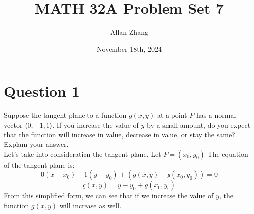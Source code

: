\documentclass[hidelinks]{article}
\title{\textbf{MATH 32A Problem Set 7}}
\author{Allan Zhang}
\date{November 18th, 2024}
\begin{document}
\hypersetup{bookmarksnumbered=true,}
\pagecolor{white}
\color{black}
\maketitle


\section{Question 1}
Suppose the tangent plane to a function $g(x, y)$ at a point $P$ has a normal
vector $\langle 0, -1, 1 \rangle$. If you increase the value of $ y$ by a small amount, do you expect that the
function will increase in value, decrease in value, or stay the same? Explain your answer. \\
Let's take into consideration the tangent plane. Let $P = (x_0, y_0)$ The equation of the tangent plane is: \[
0(x-x_0) -1(y-y_0)+(g(x, y) -g(x_0, y_0)) = 0
\]
\[
g(x, y) = y - y_0 + g(x_0, y_0)
\]
From this simplified form, we can see that if we increase the value of $y$, the function $g(x, y)$ will increase as well. 

\newpage
\end{document}
